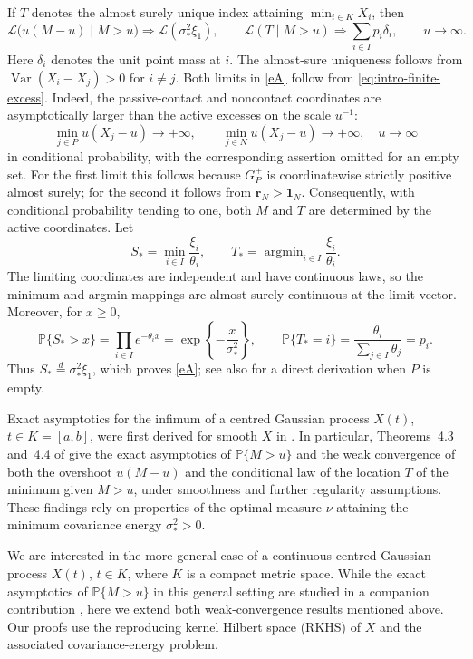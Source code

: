 \documentclass[11pt]{amsart}
\theoremstyle{definition}
\theoremstyle{remark}
\DeclareMathOperator*{\Var}{Var}
\DeclareMathOperator*{\argmin}{argmin}
\newcommand{\Pp}{\mathbb P}
\begin{document}
If $T$ denotes  the almost surely unique index attaining
$\min_{i\in K}X_i$, then  
\begin{equation}
\label{eA}
 \mathcal L\bigl(u(M-u)\mid M>u\bigr)
 \Longrightarrow \mathcal L(\sigma_*^2\xi_1),
 \qquad
 \mathcal L(T\mid M>u)\Longrightarrow
 \sum_{i\in I}p_i\delta_i, \qquad u\to\infty.
\end{equation}
Here $\delta_i$ denotes the unit point mass at $i$.
The almost-sure uniqueness follows from
$\Var(X_i-X_j)>0$ for $i\ne j$.
Both limits in \eqref{eA} follow from \eqref{eq:intro-finite-excess}.
Indeed, the passive-contact and noncontact coordinates are asymptotically
larger than the active excesses on the scale $u^{-1}$:
\[
 \min_{j\in P}u(X_j-u)\longrightarrow+\infty,
 \qquad
 \min_{j\in N}u(X_j-u)\longrightarrow+\infty, \quad u\to\infty
\] 
in conditional probability, with the corresponding assertion omitted
for an empty set.  For the first limit this follows because $G_P^+$ is
coordinatewise strictly positive almost surely; for the second it follows
from $\boldsymbol r_N>\boldsymbol1_N$.  Consequently, with conditional
probability tending to one, both $M$ and $T$ are determined by the active
coordinates.  Let
\[
 S_*=\min_{i\in I}\frac{\xi_i}{\theta_i},
 \qquad
 T_*=\argmin_{i\in I}\frac{\xi_i}{\theta_i}.
\]
The limiting coordinates are independent and have continuous laws, so
the minimum and argmin mappings are almost surely continuous at the limit
vector.  Moreover, for $x\geq0$,
\[
 \Pp\{S_*>x\}
 =\prod_{i\in I}e^{-\theta_i x}
 =\exp\left\{-\frac{x}{\sigma_*^2}\right\},
 \qquad
 \Pp\{T_*=i\}
 =\frac{\theta_i}{\sum_{j\in I}\theta_j}=p_i.
\]
Thus $S_*\stackrel{d}{=}\sigma_*^2\xi_1$, which proves \eqref{eA}; see also
\cite[Proposition~3.3(ii)]{chakrabarty2018asymptotic} for a direct
derivation when $P$ is empty.

Exact asymptotics for the infimum of a centred Gaussian process
$X(t)$, $t\in K=[a,b]$, were first derived for smooth $X$ in
\cite{chakrabarty2018asymptotic}.  In particular, Theorems~4.3 and~4.4 of
\cite{chakrabarty2018asymptotic} give the exact
asymptotics of $\Pp\{M>u\}$ and the weak convergence of both the
overshoot $u(M-u)$ and the conditional law of the location $T$ of the
minimum given $M>u$, under smoothness and further regularity assumptions.
These findings rely on properties of the optimal measure $\nu$ attaining
the minimum covariance energy $\sigma_*^2>0$.


We are interested in the more general case of a continuous centred
Gaussian process $X(t)$, $t\in K$, where $K$ is a compact metric space.
While the exact asymptotics of $\Pp\{M>u\}$ in this general setting are
studied in a companion contribution \cite{debickiHashorvaNovikov2026},
here we extend both weak-convergence results mentioned above.  Our proofs
use the reproducing kernel Hilbert space (RKHS) of $X$ and the associated
covariance-energy problem.\\
\end{document}

